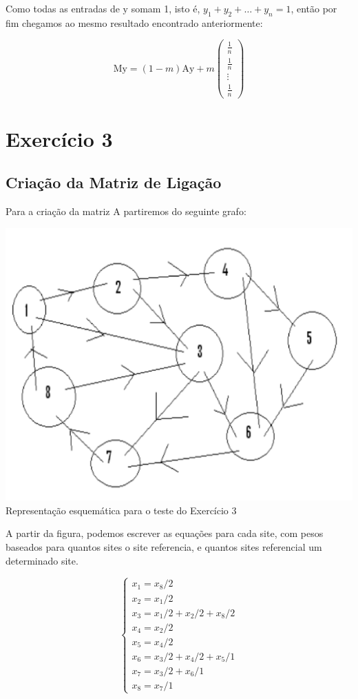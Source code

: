 \documentclass[a4paper, 12pt]{article}
\begin{document}
Como todas as entradas de $\mathrm{y}$ somam 1, isto é, $y_1+y_2+\dots +y_n=1$, então por fim chegamos ao mesmo resultado encontrado anteriormente:

$$\boxed{\ \ \mathrm{My}=\left(1-m\right)\mathrm{Ay}+m\begin{pmatrix}
\frac{1}{n}\\
\frac{1}{n}\\
\vdots \\
\frac{1}{n}
\end{pmatrix}\ \ }$$

\section{Exercício 3}
\subsection{Criação da Matriz de Ligação}
Para a criação da matriz A partiremos do seguinte grafo:

\begin{center}
    \includegraphics[width=16cm]{esquema.PNG}
     Representação esquemática para o teste do Exercício 3
    
\end{center}

A partir da figura, podemos escrever as equações para cada site, com pesos baseados para quantos sites o site referencia, e quantos sites referencial um determinado site. 

$$\begin{cases}
x_1 = x_8/2\\
x_2 = x_1/2\\
x_3 = x_1/2 + x_2/2 + x_8/2\\
x_4 = x_2/2 \\
x_5 = x_4/2\\
x_6 = x_3/2 + x_4/2 + x_5/1\\
x_7 = x_3/2 + x_6/1\\
x_8 = x_7/1
\end{cases}$$
\end{document}
